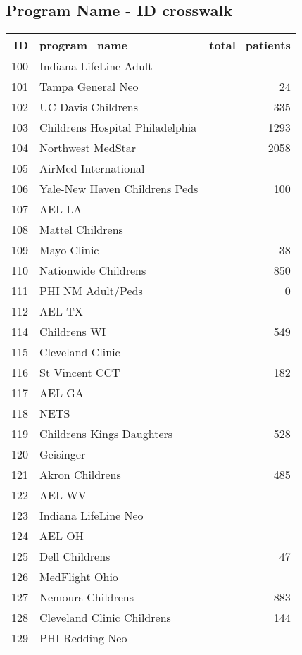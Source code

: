 \documentclass[twoside]{article}\usepackage[]{graphicx}\usepackage[]{color}
\begin{document}
\subsection*{Program Name - ID crosswalk}
\begin{table}[ht]
\centering
\begin{tabular}{rlr}
  \hline
ID & program\_name & total\_patients \\ 
  \hline
100 & Indiana LifeLine Adult &  \\ 
  101 & Tampa General Neo & 24 \\ 
  102 & UC Davis Childrens & 335 \\ 
  103 & Childrens Hospital Philadelphia & 1293 \\ 
  104 & Northwest MedStar & 2058 \\ 
  105 & AirMed International &  \\ 
  106 & Yale-New Haven Childrens Peds & 100 \\ 
  107 & AEL LA &  \\ 
  108 & Mattel Childrens &  \\ 
  109 & Mayo Clinic & 38 \\ 
  110 & Nationwide Childrens & 850 \\ 
  111 & PHI NM Adult/Peds & 0 \\ 
  112 & AEL TX &  \\ 
  114 & Childrens WI & 549 \\ 
  115 & Cleveland Clinic &  \\ 
  116 & St Vincent CCT & 182 \\ 
  117 & AEL GA &  \\ 
  118 & NETS &  \\ 
  119 & Childrens Kings Daughters & 528 \\ 
  120 & Geisinger &  \\ 
  121 & Akron Childrens & 485 \\ 
  122 & AEL WV &  \\ 
  123 & Indiana LifeLine Neo &  \\ 
  124 & AEL OH &  \\ 
  125 & Dell Childrens & 47 \\ 
  126 & MedFlight Ohio &  \\ 
  127 & Nemours Childrens & 883 \\ 
  128 & Cleveland Clinic Childrens & 144 \\ 
  129 & PHI Redding Neo &  \\ 

\end{tabular}
\end{table}
\end{document}
